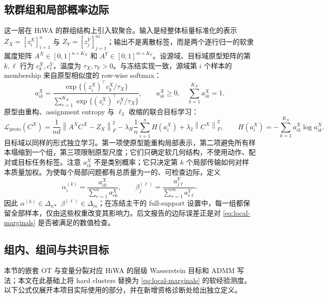 \documentclass[10pt,a4paper,fontset=windows]{ctexart}
\newcommand{\norm}[1]{\left\lVert #1\right\rVert}
\theoremstyle{definition}
\theoremstyle{remark}
\begin{document}
\subsection{软群组和局部概率边际}
这一层在 HiWA 的群组结构上引入软聚合。输入是经整体标量标准化的表示 $Z_X=[z_i^X]_{i=1}^n$ 与 $Z_Y=[z_j^Y]_{j=1}^m$；输出不是离散标签，而是两个逐行归一的软隶属度矩阵 $A^X\in[0,1]^{n\times K_X}$ 和 $A^Y\in[0,1]^{m\times K_Y}$。设源域、目标域原型矩阵的第 $k,\ell$ 行为 $c_k^X,c_\ell^Y$，温度为 $\tau_X,\tau_Y>0$。与冻结实现一致，源域第 $i$ 个样本的 membership 来自原型相似度的 row-wise softmax：
\begin{equation}
a_{ik}^X=
\frac{\exp\{(z_i^X)^\top c_k^X/\tau_X\}}
{\sum_{r=1}^{K_X}\exp\{(z_i^X)^\top c_r^X/\tau_X\}},
\qquad
a_{ik}^X\ge0,\quad \sum_{k=1}^{K_X}a_{ik}^X=1.
\label{eq:soft-membership}
\end{equation}
原型由重构、assignment entropy 与 $\ell_2$ 收缩的联合目标学习：
\begin{equation}
\mathcal L_{\mathrm{proto}}(C^X)=
\frac1{nd}\norm{A^XC^X-Z_X}_F^2
-\lambda_H\frac1n\sum_{i=1}^nH(a_i^X)
+\lambda_2\norm{C^X}_F^2,
\qquad H(a_i^X)=-\sum_{k=1}^{K_X}a_{ik}^X\log a_{ik}^X.
\label{eq:prototype-objective}
\end{equation}
目标域以同样的形式独立学习。第一项使原型能重构局部表示，第二项避免所有样本塌缩到一个组，第三项限制原型尺度；它们只确定软几何结构，不使用动作、配对或目标任务标签。注意 $a_{ik}^X$ 不是类别概率；它只决定第 $k$ 个局部传输如何对样本质量加权。为使每个局部问题都有总质量为一的、可检查边际，定义
\begin{equation}
\alpha_i^{(k)}=\frac{a_{ik}^X}{\sum_{r=1}^n a_{rk}^X},\qquad
\beta_j^{(\ell)}=\frac{a_{j\ell}^Y}{\sum_{r=1}^m a_{r\ell}^Y}.
\label{eq:local-marginals}
\end{equation}
因此 $\alpha^{(k)}\in\Delta_n$、$\beta^{(\ell)}\in\Delta_m$；在冻结主干的 full-support 设置中，每一组都保留全部样本，仅由这些权重改变其影响力。后文报告的边际误差正是对 \cref{eq:local-marginals} 是否被满足的数值检查。

\subsection{组内、组间与共识目标}
本节的嵌套 OT 与变量分裂对应 HiWA 的层级 Wasserstein 目标和 ADMM 写法\cite{lee2019hierarchical}；本文在此基础上将 hard clusters 替换为 \cref{eq:local-marginals} 的软经验测度。以下公式仅展开本项目实际使用的部分，并在新增资格诊断处给出独立定义。
\end{document}
